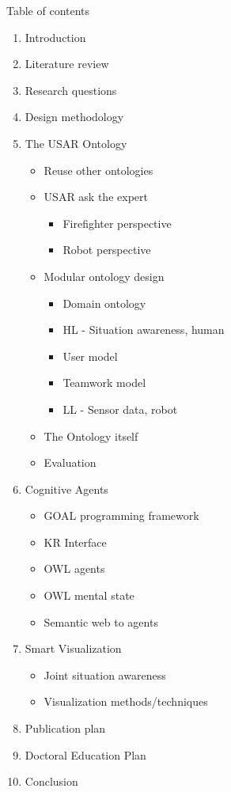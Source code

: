 Table of contents
\tableofcontents{}

\begin{enumerate}
\item Introduction
\item Literature review
\item Research questions
\item Design methodology
\item The USAR Ontology
\begin{itemize}
\item Reuse other ontologies
\item USAR ask the expert 
\begin{itemize}
\item Firefighter perspective
\item Robot perspective
\end{itemize}
\item Modular ontology design
\begin{itemize}
\item Domain ontology
\item HL - Situation awareness, human 
\item User model
\item Teamwork model
\item LL - Sensor data, robot
\end{itemize}
\item The Ontology itself
\item Evaluation
\end{itemize}

\item Cognitive Agents
\begin{itemize}
\item GOAL programming framework
\item KR Interface
\item OWL agents
\item OWL mental state
\item Semantic web to agents
\end{itemize}

\item Smart Visualization
\begin{itemize}
\item Joint situation awareness
\item Visualization methods/techniques
\end{itemize}
\item Publication plan
\item Doctoral Education Plan
\item Conclusion
\end{enumerate}
    
    
  
  